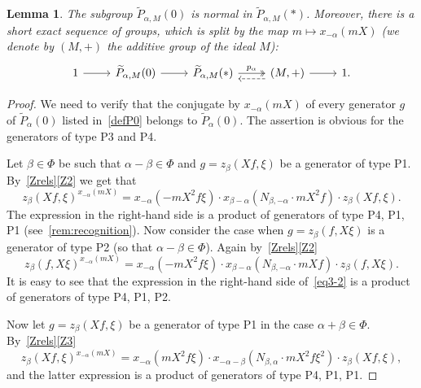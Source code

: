 \documentclass[oneside, 8pt]{amsart}
\newtheorem{lemma}{Lemma}
\theoremstyle{remark}
\theoremstyle{definition}
\numberwithin{lemma}{section}
\numberwithin{prop}{section}
\numberwithin{corollary}{section}
\numberwithin{externaltheorem}{section}
\numberwithin{equation}{section}
\begin{document}
\begin{lemma}\label{P0_normal} The subgroup $\widetilde{P}_{\alpha, M}(0)$ is normal in $\widetilde{P}_{\alpha, M}(*)$. Moreover, there is a short exact sequence of groups, which is split by the map $m \mapsto x_{-\alpha}(mX)$ (we denote by $(M, +)$ the additive group of the ideal $M$):
\[\begin{tikzcd} 1 \arrow{r} & \widetilde{P}_{\alpha,M}(0) \arrow{r} & \widetilde{P}_{\alpha,M}(*) \ar[r, "p_\alpha", twoheadrightarrow] & (M, +) \arrow[l, dashrightarrow, shift left=2] \arrow{r} & 1. \end{tikzcd} \] \end{lemma}
\begin{proof} We need to verify that the conjugate by $x_{-\alpha}(mX)$ of every generator $g$ of $\widetilde{P}_\alpha(0)$ listed in~\cref{defP0} belongs to $\widetilde{P}_\alpha(0)$.
The assertion is obvious for the generators of type P3 and P4.

Let $\beta\in\Phi$ be such that $\alpha - \beta \in \Phi$ and $g = z_\beta(Xf, \xi)$ be a generator of type P1. By~\cref{Zrels}\ref{Z2} we get that \begin{equation} z_{\beta}(Xf, \xi) ^ {x_{-\alpha}(mX)} =  x_{-\alpha} (- mX^2f\xi) \cdot x_{\beta-\alpha} (N_{\beta, -\alpha}\cdot mX^2f) \cdot z_{\beta}(Xf, \xi). \label{eq3-1} \end{equation}
The expression in the right-hand side is a product of generators of type P4, P1, P1 (see~\cref{rem:recognition}).
Now consider the case when $g = z_\beta(f, X\xi)$ is a generator of type P2 (so that $\alpha-\beta\in\Phi$). Again by~\cref{Zrels}\ref{Z2}
\begin{equation}
z_{\beta}(f, X\xi) ^ {x_{-\alpha}(mX)} =  x_{-\alpha} (- mX^2f\xi ) \cdot x_{\beta-\alpha} (N_{\beta, -\alpha}\cdot mXf) \cdot z_{\beta}(f, X\xi). \label{eq3-2} \end{equation}
It is easy to see that the expression in the right-hand side of~\eqref{eq3-2} is a product of generators of type P4, P1, P2.

Now let $g = z_{\beta}(Xf, \xi)$ be a generator of type P1 in the case $\alpha + \beta \in \Phi$. By~\cref{Zrels}\ref{Z3}
\begin{equation} \label{eq3-3} z_{\beta}(Xf, \xi) ^ {x_{-\alpha}(mX)} = x_{-\alpha} (mX^2f\xi ) \cdot x_{-\alpha-\beta} (N_{\beta,\alpha}\cdot mX^2f\xi^2) \cdot z_{\beta}(Xf, \xi), \end{equation}
and the latter expression is a product of generators of type P4, P1, P1.


\end{proof}
\end{document}

